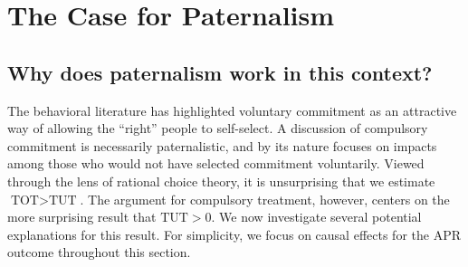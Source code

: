 \documentclass[oneside,11pt]{article}
\begin{document}




\section{The Case for Paternalism}
\label{Paternalism}

\subsection{Why does paternalism work in this context?}
\label{why_paternalism}

The behavioral literature has highlighted voluntary commitment as an attractive way of allowing the ``right'' people to self-select. A discussion of compulsory commitment is necessarily paternalistic, and by its nature focuses on impacts among those who would not have selected commitment voluntarily. Viewed through the lens of rational choice theory, it is unsurprising that we estimate $\text{TOT}>\text{TUT}$. The argument for compulsory treatment, however, centers on the more surprising result that $\text{TUT}>0$.  We now investigate several potential explanations for this result.
For simplicity, we focus on causal effects for the APR outcome throughout this section.
\end{document}
